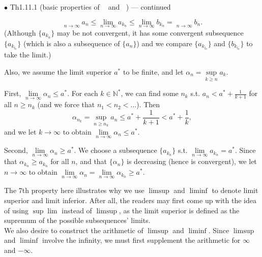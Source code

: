 \documentclass{article}
\begin{document}
\begin{Th}{$\bullet$ Th1.11.1 (basic properties of $\mathop{\overline{\lim}}$ and $\mathop{\underline{\lim}}$) —  continued}
\begin{compactenum}
        $$\mathop{\underline{\lim}}\limits_{n\to\infty}a_n \leq \lim\limits_{n\to\infty}a_{k_n} \leq \lim\limits_{n\to\infty}b_{k_n} = \mathop{\underline{\lim}}\limits_{n\to\infty}b_n.$$
        (Although $\{a_{k_n}\}$ may be not convergent, it has some convergent subsequence $\{a_{k_{l_n}}\}$ (which is also a subsequence of $\{a_n\}$) and we compare $\{a_{k_{l_n}}\}$ and $\{b_{k_{l_n}}\}$ to take the limit.)
        \item Also, we assume the limit superior $a^\ast$ to be finite, and let $\alpha_n = \sup\limits_{k\geq n}a_k$.
        \begin{compactitem}
            \item First, $\lim\limits_{n\to\infty}\alpha_n \leq a^\ast$. For each $k\in\mathbb{N}^\ast$, we can find some $n_k$ s.t. $a_n<a^\ast+\frac{1}{k+1}$ for all $n\geq n_k$ (and we force that $n_1<n_2<\dots$). Then 
            $$\alpha_{n_k} = \sup\limits_{n\geq n_k}a_n\leq a^\ast+\frac{1}{k+1}<a^\ast+\frac{1}{k},$$ 
            and we let $k\rightarrow\infty$ to obtain $\lim\limits_{n\to\infty}\alpha_n \leq a^\ast$.
            \item Second, $\lim\limits_{n\to\infty}\alpha_n \geq a^\ast$. We choose a subsequence $\{a_{k_n}\}$ s.t. $\lim\limits_{n\to\infty}a_{k_n} = a^\ast$. Since that $\alpha_{k_n} \geq a_{k_n}$ for all $n$, and that $\{\alpha_n\}$ is decreasing (hence is convergent), we let $n\rightarrow\infty$ to obtain $\lim\limits_{n\to\infty}\alpha_n = \lim\limits_{n\to\infty}\alpha_{k_n} \geq a^\ast$.
        \end{compactitem}
    \end{compactenum}
\end{Th}

\begin{Rmk}{}
    The 7th property here illustrates why we use $\limsup$ and $\liminf$ to denote limit superior and limit inferior. After all, the readers may first come up with the idea of using $\sup\lim$ instead of $\limsup$, as the limit superior is defined as the supremum of the possible subsequences' limits. \\
    We also desire to construct the arithmetic of $\limsup$ and $\liminf$. Since $\limsup$ and $\liminf$ involve the infinity, we must first supplement the arithmetic for $\infty$ and $-\infty$.
\end{Rmk}
\end{document}
